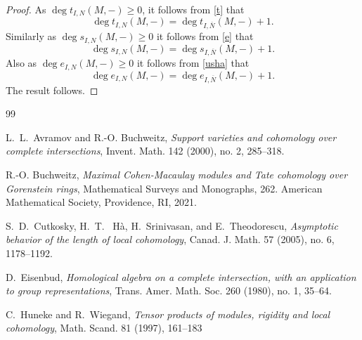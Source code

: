 \documentclass{amsart}
\newcommand{\ov}{\overline}
\theoremstyle{plain}
\theoremstyle{definition}
\theoremstyle{remark}
\begin{document}
\begin{proof}
As $\deg t_{I,N}(M, -) \geq 0$, it follows from  \ref{t} that $$\deg t_{I,N}(M, -) = \deg t_{I,\ov{N}}(M, -)  +  1.$$ Similarly  as $\deg s_{I,N}(M, -) \geq 0$ it follows from \ref{e} that
$$\deg s_{I,N}(M, -) = \deg s_{I,\ov{N}}(M, -) + 1.$$  Also as $\deg e_{I,N}(M, -) \geq 0$ it follows from  \ref{usha} that
$$\deg e_{I,N}(M, -) = \deg e_{I,\ov{N}}(M, -) + 1.$$
  The result follows.
  \end{proof}


\begin{thebibliography} {99}


L.~L.~Avramov and R.-O. Buchweitz,
\emph{Support varieties and cohomology over complete intersections},
Invent. Math. 142 (2000), no. 2, 285--318.

          R.-O. Buchweitz,
		\emph{Maximal {C}ohen-{M}acaulay modules and {T}ate cohomology over {G}orenstein rings},
Mathematical Surveys and Monographs, 262. American Mathematical Society, Providence, RI, 2021.




S.~D.~Cutkosky, H.~T.~ H\`a, H.~Srinivasan,
              and E.~Theodorescu,
\emph{Asymptotic behavior of the length of local cohomology},
Canad. J. Math. 57 (2005), no. 6, 1178--1192.


D.~Eisenbud,
\emph{Homological algebra on a complete intersection, with an application to group representations},
Trans. Amer. Math. Soc.   260 (1980), no. 1, 35--64.

C.~Huneke and R.~Wiegand,
\emph{Tensor products of modules, rigidity and local cohomology},
 Math. Scand. 81 (1997), 161--183



\end{thebibliography}
\end{document}
